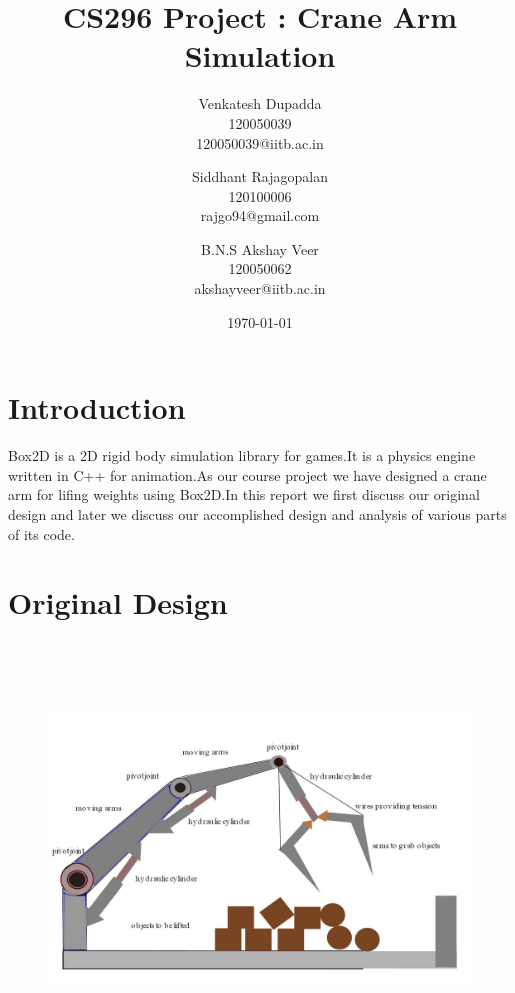 \documentclass[11pt]{article}
\begin{document}
\title{CS296 Project : Crane Arm Simulation}
\author{Venkatesh Dupadda\\
		120050039\\
		120050039@iitb.ac.in \and 
        Siddhant Rajagopalan\\
		120100006\\
		rajgo94@gmail.com \and
		B.N.S Akshay Veer\\
		120050062\\
		akshayveer@iitb.ac.in
		\\}	
\date{\today} 
\maketitle

\section{Introduction}
Box2D is a 2D rigid body simulation library for games.It is a physics engine written in C++ for animation.As our course project we have designed a crane arm for lifing weights using Box2D.In this report we first discuss our original design and later we discuss our accomplished design and analysis of various parts of its code.
\section{Original Design}

\begin{figure}[ht!]
\centering
\includegraphics[height=11cm]{design.jpg}
\end{figure}
\end{document}

